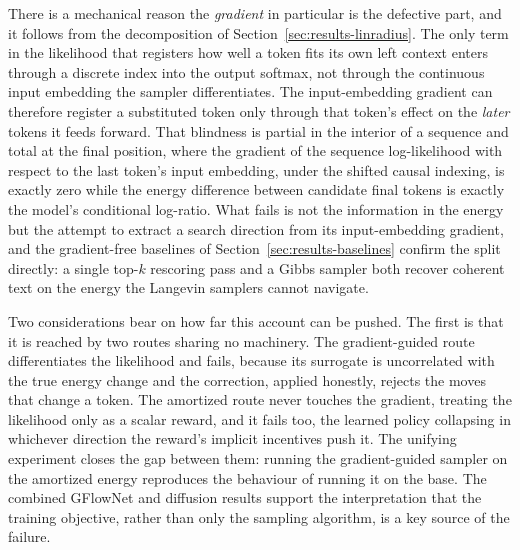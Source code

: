 There is a mechanical reason the \emph{gradient} in particular is the defective part, and it follows from the decomposition of Section~\ref{sec:results-linradius}. The only term in the likelihood that registers how well a token fits its own left context enters through a discrete index into the output softmax, not through the continuous input embedding the sampler differentiates. The input-embedding gradient can therefore register a substituted token only through that token's effect on the \emph{later} tokens it feeds forward. That blindness is partial in the interior of a sequence and total at the final position, where the gradient of the sequence log-likelihood with respect to the last token's input embedding, under the shifted causal indexing, is exactly zero while the energy difference between candidate final tokens is exactly the model's conditional log-ratio. What fails is not the information in the energy but the attempt to extract a search direction from its input-embedding gradient, and the gradient-free baselines of Section~\ref{sec:results-baselines} confirm the split directly: a single top-$k$ rescoring pass and a Gibbs sampler both recover coherent text on the energy the Langevin samplers cannot navigate.

Two considerations bear on how far this account can be pushed. The first is that it is reached by two routes sharing no machinery. The gradient-guided route differentiates the likelihood and fails, because its surrogate is uncorrelated with the true energy change and the correction, applied honestly, rejects the moves that change a token. The amortized route never touches the gradient, treating the likelihood only as a scalar reward, and it fails too, the learned policy collapsing in whichever direction the reward's implicit incentives push it. The unifying experiment closes the gap between them: running the gradient-guided sampler on the amortized energy reproduces the behaviour of running it on the base. The combined GFlowNet and diffusion results support the interpretation that the training objective, rather than only the sampling algorithm, is a key source of the failure.

